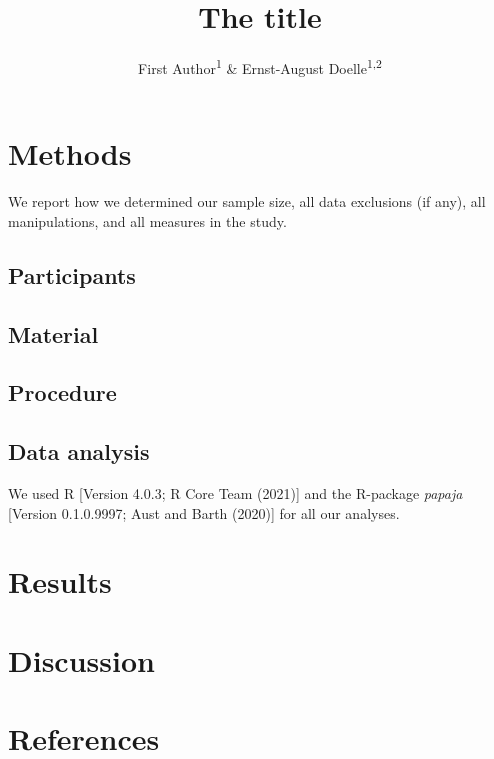 \documentclass[
  english,
  man]{apa6}
\title{The title}
\author{First Author\textsuperscript{1} \& Ernst-August Doelle\textsuperscript{1,2}}
\date{}
\affiliation{\vspace{0.5cm}\textsuperscript{1} Wilhelm-Wundt-University\\\textsuperscript{2} Konstanz Business School}
\begin{document}
\maketitle

\hypertarget{methods}{%
\section{Methods}\label{methods}}

We report how we determined our sample size, all data exclusions (if any), all manipulations, and all measures in the study.

\hypertarget{participants}{%
\subsection{Participants}\label{participants}}

\hypertarget{material}{%
\subsection{Material}\label{material}}

\hypertarget{procedure}{%
\subsection{Procedure}\label{procedure}}

\hypertarget{data-analysis}{%
\subsection{Data analysis}\label{data-analysis}}

We used R {[}Version 4.0.3; R Core Team (2021){]} and the R-package \emph{papaja} {[}Version 0.1.0.9997; Aust and Barth (2020){]} for all our analyses.

\hypertarget{results}{%
\section{Results}\label{results}}

\hypertarget{discussion}{%
\section{Discussion}\label{discussion}}

\newpage

\hypertarget{references}{%
\section{References}\label{references}}
\end{document}
